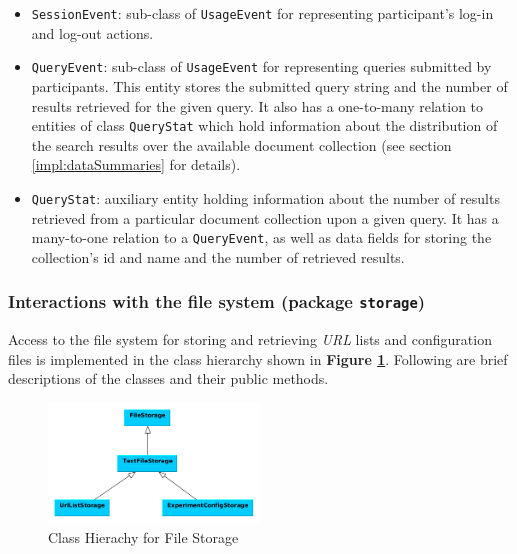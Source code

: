 \documentclass[a4paper]{usiinfbachelorproject}
\begin{document}
\begin{description}
\begin{itemize}
                \item \texttt{SessionEvent}: sub-class of \texttt{UsageEvent} for representing participant's log-in and log-out  
                    actions.

                \item \texttt{QueryEvent}: sub-class of \texttt{UsageEvent} for representing queries submitted by participants.
                    This entity stores the submitted query string and the number of results retrieved for the given query.
                    It also has a one-to-many relation to entities of class \texttt{QueryStat} which hold information about the 
                    distribution of the search results over the available document collection (see section \ref{impl:dataSummaries} for details). 

                \item \texttt{QueryStat}: auxiliary entity holding information about the number of results retrieved from a particular
                    document collection upon a given query. It has a many-to-one relation to a \texttt{QueryEvent}, as well as data fields
                    for storing the collection's id and name and the number of retrieved results. 

            \end{itemize}


    \end{description}

\subsubsection{\textbf{Interactions with the file system (package \texttt{storage})}} \label{sec:archDataLayerStorage}

Access to the file system for storing and retrieving \emph{URL} lists and configuration files is implemented in the class
hierarchy shown in \textbf{Figure \ref{fig:storage}}. Following are brief descriptions of the classes and their
public methods.

\begin{figure}[h!]
\centering
\includegraphics[width=0.5\textwidth]{figures/storage}
\caption{Class Hierachy for File Storage}
\label{fig:storage}
\end{figure}
\end{document}
